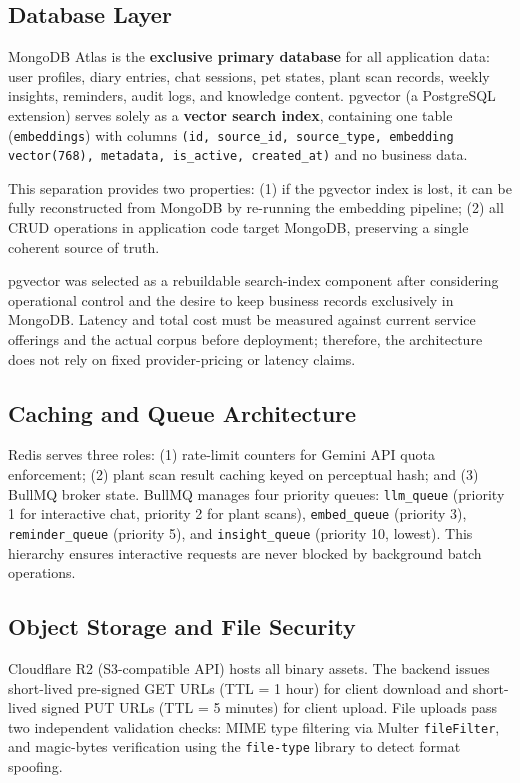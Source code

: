 \documentclass[conference]{IEEEtran}
\begin{document}
\subsection{Database Layer}

MongoDB Atlas is the \textbf{exclusive primary database} for all application data: user profiles, diary entries, chat sessions, pet states, plant scan records, weekly insights, reminders, audit logs, and knowledge content. pgvector (a PostgreSQL extension) serves solely as a \textbf{vector search index}, containing one table (\texttt{embeddings}) with columns \texttt{(id, source\_id, source\_type, embedding vector(768), metadata, is\_active, created\_at)} and no business data.

This separation provides two properties: (1) if the pgvector index is lost, it can be fully reconstructed from MongoDB by re-running the embedding pipeline; (2) all CRUD operations in application code target MongoDB, preserving a single coherent source of truth.

pgvector was selected as a rebuildable search-index component after considering operational control and the desire to keep business records exclusively in MongoDB. Latency and total cost must be measured against current service offerings and the actual corpus before deployment; therefore, the architecture does not rely on fixed provider-pricing or latency claims.

\subsection{Caching and Queue Architecture}

Redis serves three roles: (1) rate-limit counters for Gemini API quota enforcement; (2) plant scan result caching keyed on perceptual hash; and (3) BullMQ broker state. BullMQ manages four priority queues: \texttt{llm\_queue} (priority 1 for interactive chat, priority 2 for plant scans), \texttt{embed\_queue} (priority 3), \texttt{reminder\_queue} (priority 5), and \texttt{insight\_queue} (priority 10, lowest). This hierarchy ensures interactive requests are never blocked by background batch operations.

\subsection{Object Storage and File Security}

Cloudflare R2 (S3-compatible API) hosts all binary assets. The backend issues short-lived pre-signed GET URLs (TTL = 1 hour) for client download and short-lived signed PUT URLs (TTL = 5 minutes) for client upload. File uploads pass two independent validation checks: MIME type filtering via Multer \texttt{fileFilter}, and magic-bytes verification using the \texttt{file-type} library to detect format spoofing.
\end{document}
